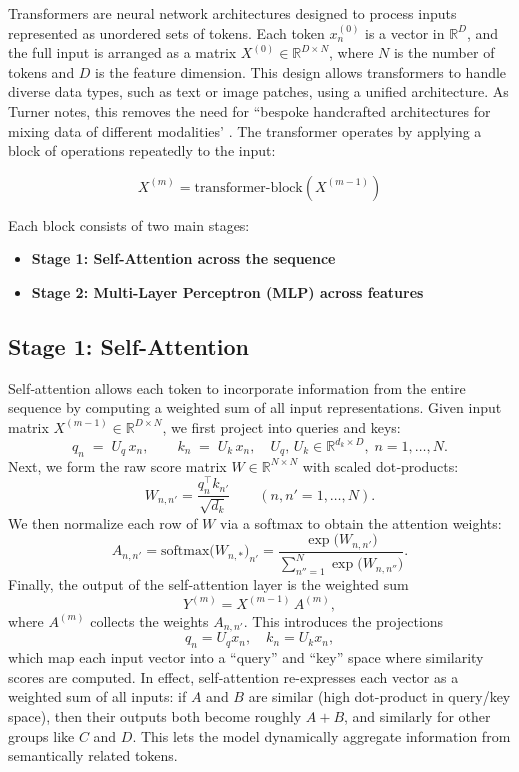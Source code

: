 \documentclass{article}
\begin{document}
Transformers are neural network architectures designed to process inputs represented as unordered sets of tokens. Each token \( x_n^{(0)} \) is a vector in \( \mathbb{R}^D \), and the full input is arranged as a matrix \( X^{(0)} \in \mathbb{R}^{D \times N} \), where \( N \) is the number of tokens and \( D \) is the feature dimension. This design allows transformers to handle diverse data types, such as text or image patches, using a unified architecture. As Turner notes, this removes the need for ``bespoke handcrafted architectures for mixing data of different modalities' \cite{turner2024introductiontransformers}. The transformer operates by applying a block of operations repeatedly to the input:

\[
X^{(m)} = \text{transformer-block}(X^{(m-1)})
\]

Each block consists of two main stages:
\begin{itemize}
  \item \textbf{Stage 1: Self-Attention across the sequence}
  \item \textbf{Stage 2: Multi-Layer Perceptron (MLP) across features}
\end{itemize}

\subsection{Stage 1: Self-Attention}

Self‐attention allows each token to incorporate information from the entire sequence by computing a weighted sum of all input representations.  Given input matrix \(X^{(m-1)}\in\mathbb{R}^{D\times N}\), we first project into queries and keys:
\[
q_n \;=\; U_q\,x_n,\qquad
k_n \;=\; U_k\,x_n,
\quad
U_q,\,U_k\in\mathbb{R}^{d_k\times D},\;n=1,\dots,N.
\]
Next, we form the raw score matrix \(W\in\mathbb{R}^{N\times N}\) with scaled dot‐products:
\[
W_{n,n'}
=\frac{q_n^{\!\top}k_{n'}}{\sqrt{d_k}}
\qquad
(n,n'=1,\dots,N).
\]
We then normalize each row of \(W\) via a softmax to obtain the attention weights:
\[
A_{n,n'}
=\mathrm{softmax}\bigl(W_{n,\ast}\bigr)_{n'}
=\frac{\exp\bigl(W_{n,n'}\bigr)}
      {\sum_{n''=1}^N\exp\bigl(W_{n,n''}\bigr)}.
\]
Finally, the output of the self‐attention layer is the weighted sum
\[
Y^{(m)}
= X^{(m-1)}\,A^{(m)},
\]
where \(A^{(m)}\) collects the weights \(A_{n,n'}\).  
This introduces the projections 
\[
q_n = U_q x_n,\quad k_n = U_k x_n,
\]
which map each input vector into a “query” and “key” space where similarity scores are computed.  In effect, self-attention re-expresses each vector as a weighted sum of all inputs: if \(A\) and \(B\) are similar (high dot-product in query/key space), then their outputs both become roughly \(A+B\), and similarly for other groups like \(C\) and \(D\).  This lets the model dynamically aggregate information from semantically related tokens.
\end{document}
